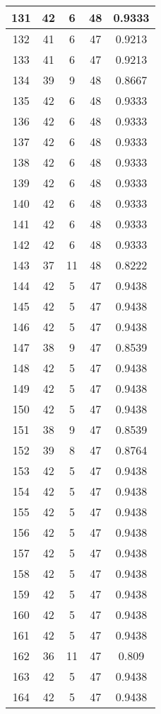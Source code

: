 \documentclass[letterpaper, 12pt]{article}
\begin{document}
\begin{longtable}{|c|c|c|c|c|}
\hline
131 & 42 & 6 & 48 & 0.9333 \\
\hline
132 & 41 & 6 & 47 & 0.9213 \\
\hline
133 & 41 & 6 & 47 & 0.9213 \\
\hline
134 & 39 & 9 & 48 & 0.8667 \\
\hline
135 & 42 & 6 & 48 & 0.9333 \\
\hline
136 & 42 & 6 & 48 & 0.9333 \\
\hline
137 & 42 & 6 & 48 & 0.9333 \\
\hline
138 & 42 & 6 & 48 & 0.9333 \\
\hline
139 & 42 & 6 & 48 & 0.9333 \\
\hline
140 & 42 & 6 & 48 & 0.9333 \\
\hline
141 & 42 & 6 & 48 & 0.9333 \\
\hline
142 & 42 & 6 & 48 & 0.9333 \\
\hline
143 & 37 & 11 & 48 & 0.8222 \\
\hline
144 & 42 & 5 & 47 & 0.9438 \\
\hline
145 & 42 & 5 & 47 & 0.9438 \\
\hline
146 & 42 & 5 & 47 & 0.9438 \\
\hline
147 & 38 & 9 & 47 & 0.8539 \\
\hline
148 & 42 & 5 & 47 & 0.9438 \\
\hline
149 & 42 & 5 & 47 & 0.9438 \\
\hline
150 & 42 & 5 & 47 & 0.9438 \\
\hline
151 & 38 & 9 & 47 & 0.8539 \\
\hline
152 & 39 & 8 & 47 & 0.8764 \\
\hline
153 & 42 & 5 & 47 & 0.9438 \\
\hline
154 & 42 & 5 & 47 & 0.9438 \\
\hline
155 & 42 & 5 & 47 & 0.9438 \\
\hline
156 & 42 & 5 & 47 & 0.9438 \\
\hline
157 & 42 & 5 & 47 & 0.9438 \\
\hline
158 & 42 & 5 & 47 & 0.9438 \\
\hline
159 & 42 & 5 & 47 & 0.9438 \\
\hline
160 & 42 & 5 & 47 & 0.9438 \\
\hline
161 & 42 & 5 & 47 & 0.9438 \\
\hline
162 & 36 & 11 & 47 & 0.809 \\
\hline
163 & 42 & 5 & 47 & 0.9438 \\
\hline
164 & 42 & 5 & 47 & 0.9438 \\

\end{longtable}
\end{document}
